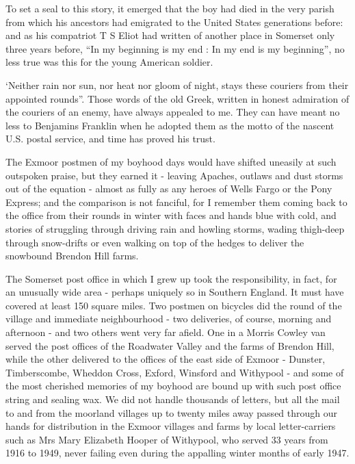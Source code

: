 To set a seal to this story, it emerged that the boy had died in the very parish from which his ancestors had emigrated to the United States generations before: and as his compatriot T S Eliot had written of another place in Somerset only three years before, “In my beginning is my end : In my end is my beginning”, no less true was this for the young American soldier.


‘Neither rain nor sun, nor heat nor gloom of night, stays these couriers from their appointed rounds”.
 Those words of the old Greek, written in honest admiration of the couriers of an enemy, have always appealed to me. They can have meant no less to Benjamins Franklin when he adopted them as the motto of the nascent U.S. postal service, and time has proved his trust.

The Exmoor postmen of my boyhood days would have shifted uneasily at such outspoken praise, but they earned it - leaving Apaches, outlaws and dust storms out of the equation - almost as fully as any heroes of Wells Fargo or the Pony Express; and the comparison is not fanciful, for I remember them coming back to the office from their rounds in winter with faces and hands blue with cold, and stories of struggling through driving rain and howling storms, wading thigh-deep through snow-drifts or even walking on top of the hedges to deliver the snowbound Brendon Hill farms. 

The Somerset post office in which I grew up took the responsibility, in fact, for an unusually wide area - perhaps uniquely so in Southern England. It must have covered at least 150 square miles. Two postmen on bicycles did the round of the village and immediate neighbourhood - two deliveries, of course, morning and afternoon - and two others went very far afield. One in a Morris Cowley van served the post offices of the Roadwater Valley and the farms of Brendon Hill, while the other delivered to the offices of the east side of Exmoor - Dunster, Timberscombe, Wheddon Cross, Exford, Winsford and Withypool - and some of the most cherished memories of my boyhood are bound up with such post office string and sealing wax. We did not handle thousands of letters, but all the mail to and from the moorland villages up to twenty miles away passed through our hands for distribution in the Exmoor villages and farms by local letter-carriers such as Mrs Mary Elizabeth Hooper of Withypool, who served 33 years from 1916 to 1949, never failing even during the appalling winter months of early 1947. 	

